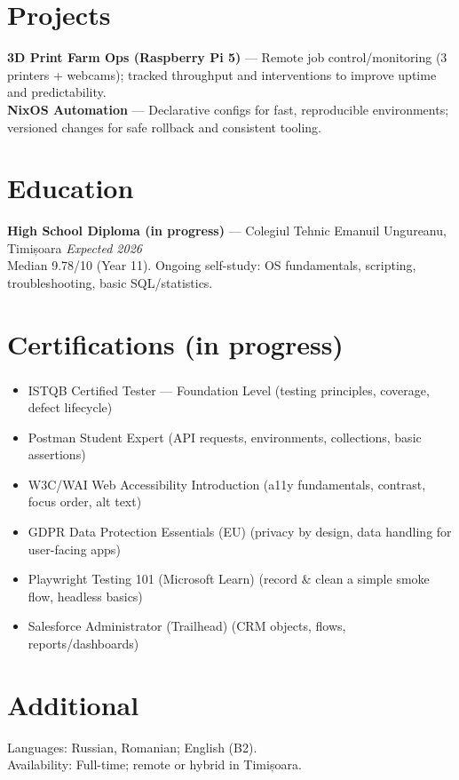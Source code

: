 \documentclass[10pt,a4paper]{article}
\begin{document}
\section*{Projects}
\textbf{3D Print Farm Ops (Raspberry Pi 5)} --- Remote job control/monitoring (3 printers + webcams); tracked throughput and interventions to improve uptime and predictability.\\
\textbf{NixOS Automation} --- Declarative configs for fast, reproducible environments; versioned changes for safe rollback and consistent tooling.

\section*{Education}
\textbf{High School Diploma (in progress)} --- Colegiul Tehnic Emanuil Ungureanu, Timișoara \hfill \textit{Expected 2026}\\
Median 9.78/10 (Year 11). Ongoing self-study: OS fundamentals, scripting, troubleshooting, basic SQL/statistics.

\section*{Certifications \textnormal{(in progress)}}
\begin{itemize}
  \item ISTQB\textsuperscript{\textregistered} Certified Tester --- Foundation Level (testing principles, coverage, defect lifecycle)
  \item Postman Student Expert (API requests, environments, collections, basic assertions)
  \item W3C/WAI Web Accessibility Introduction (a11y fundamentals, contrast, focus order, alt text)
  \item GDPR Data Protection Essentials (EU) (privacy by design, data handling for user-facing apps)
  \item Playwright Testing 101 (Microsoft Learn) (record \& clean a simple smoke flow, headless basics)
  \item Salesforce Administrator (Trailhead) (CRM objects, flows, reports/dashboards) %
\end{itemize}

\section*{Additional}
Languages: Russian, Romanian; English (B2).\\
Availability: Full-time; remote or hybrid in Timișoara.\\
\end{document}

